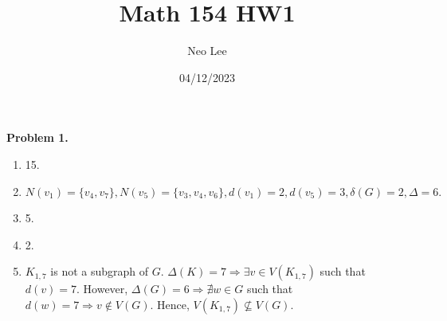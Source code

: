 \documentclass{article}
\title{Math 154 HW1}
\author{Neo Lee}
\date{04/12/2023}
\begin{document}
 

\maketitle 

\textbf{Problem 1.}
\begin{enumerate}[label=(\alph*)]
    \item 15.
    \item $N(v_1) = \{v_4, v_7\}, N(v_5) = \{v_3,v_4,v_6\}, d(v_1) = 2, d(v_5) = 3, \delta(G) = 2, \Delta = 6.$
    \item 5.
    \item 2.
    \item $K_{1,7}$ is not a subgraph of $G$. $\Delta(K) = 7 \Rightarrow \exists v \in V(K_{1,7})$ such that $d(v) = 7$.
    However, $\Delta(G) = 6 \Rightarrow \nexists w \in G$ such that $d(w) = 7 \Rightarrow v\not\in V(G)$.
    Hence, $V(K_{1,7}) \nsubseteq V(G)$.
\end{enumerate}
\bigbreak
\end{document}
